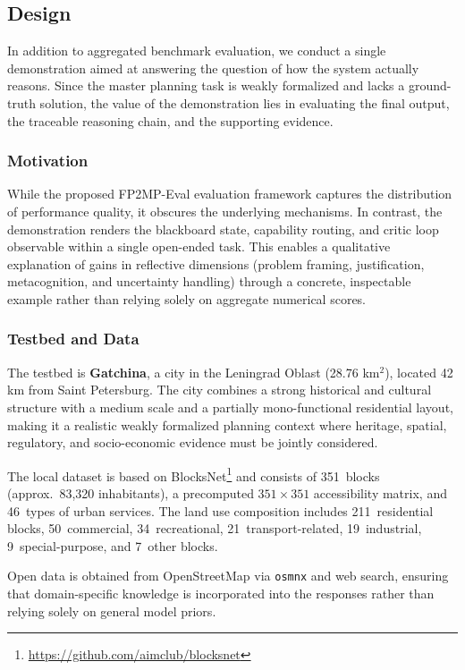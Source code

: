 \subsection{ Design}

In addition to aggregated benchmark evaluation, we conduct a single demonstration aimed at answering the question of how the system actually reasons.
Since the master planning task is weakly formalized and lacks a ground-truth solution, the value of the demonstration lies in evaluating the final output, the traceable reasoning chain, and the supporting evidence.

\subsubsection{Motivation}

While the proposed FP2MP-Eval evaluation framework captures the distribution of performance quality, it obscures the underlying mechanisms.
In contrast, the demonstration renders the blackboard state, capability routing, and critic loop observable within a single open-ended task.
This enables a qualitative explanation of gains in reflective dimensions (problem framing, justification, metacognition, and uncertainty handling) through a concrete, inspectable example rather than relying solely on aggregate numerical scores.

\subsubsection{Testbed and Data}

The testbed is \textbf{Gatchina}, a city in the Leningrad Oblast (28.76 km$^2$), located 42 km from Saint Petersburg.
The city combines a strong historical and cultural structure with a medium scale and a partially mono-functional residential layout, making it a realistic weakly formalized planning context where heritage, spatial, regulatory, and socio-economic evidence must be jointly considered.

The local dataset is based on BlocksNet\footnote{\url{https://github.com/aimclub/blocksnet}} and consists of 351~blocks (approx.\ 83,320 inhabitants), a precomputed $351 \times 351$ accessibility matrix, and 46~types of urban services.
The land use composition includes 211~residential blocks, 50~commercial, 34~recreational, 21~transport-related, 19~industrial, 9~special-purpose, and 7~other blocks. 

Open data is obtained from OpenStreetMap via \texttt{osmnx} and web search, ensuring that domain-specific knowledge is incorporated into the responses rather than relying solely on general model priors.

